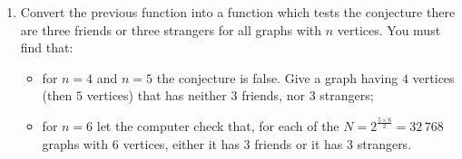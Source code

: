 \documentclass[11pt,class=report,crop=false]{standalone}
\begin{document}
\begin{activite}[Ramsey's theorem for $n=6$]
\begin{enumerate}
  \item Convert the previous function into a  function
which tests the conjecture \og{}there are three friends or three strangers\fg{} for all graphs with $n$ vertices.
You must find that:
\begin{itemize}
\item for $n=4$ and $n=5$ the conjecture is false. Give a graph having $4$ vertices (then $5$ vertices) that has neither $3$ friends, nor $3$ strangers;
\item for $n=6$ let the computer check that, for each of the $N = 2^{\frac{5 \times 6}{2}} = 32\,768$ graphs with $6$ vertices, either it has $3$ friends or it has $3$ strangers.
\end{itemize}
\end{enumerate}   
     
\end{activite}
\end{document}

